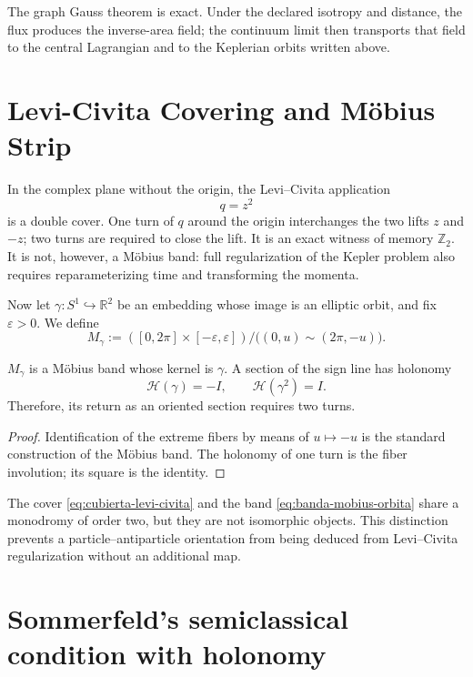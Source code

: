 The graph Gauss theorem is exact. Under the declared isotropy and
distance, the flux produces the inverse-area field; the continuum limit
then transports that field to the central Lagrangian and to the
Keplerian orbits written above.

\section{Levi-Civita Covering and Möbius Strip}
\label{sec:levi-civita-mobius-kepler}

In the complex plane without the origin, the Levi--Civita application
\[
 q=z^2
 \tag{K8}\label{eq:cubierta-levi-civita}
\]
is a double cover. One turn of \(q\) around the origin interchanges
the two lifts \(z\) and \(-z\); two turns are required to close the
lift. It is
an exact witness of memory \(\mathbb Z_2\). It is not, however, a Möbius
band: full regularization of the Kepler problem also requires
reparameterizing time and transforming the momenta.

Now let \(\gamma:S^1\hookrightarrow\mathbb R^2\) be an embedding whose image is an elliptic orbit, and
fix \(\varepsilon>0\). We define
\[
 M_\gamma
 :=([0,2\pi]\times[-\varepsilon,\varepsilon])/
 \bigl((0,u)\sim(2\pi,-u)\bigr).
 \tag{K9}\label{eq:banda-mobius-orbita}
\]

\begin{theorem}
\label{thm:periodo-orientado-banda-orbital}
\(M_\gamma\) is a Möbius band whose kernel is \(\gamma\). A section
of the sign line has holonomy
\[
 \mathcal H(\gamma)=-I,
 \qquad
 \mathcal H(\gamma^2)=I.
 \tag{K10}\label{eq:holonomia-banda-orbital}
\]
Therefore, its return as an oriented section requires two turns.
\end{theorem}

\begin{proof}
Identification of the extreme fibers by means of \(u\mapsto-u\) is the
standard construction of the Möbius band. The holonomy of one turn is
the fiber involution; its square is the identity.
\end{proof}

The cover \eqref{eq:cubierta-levi-civita} and the band
\eqref{eq:banda-mobius-orbita} share a monodromy of order two, but they are not
isomorphic objects. This distinction prevents a particle--antiparticle
orientation from being deduced from Levi--Civita regularization without an
additional map.

\section{Sommerfeld's semiclassical condition with holonomy}
\label{sec:sommerfeld-holonomia-banda}

